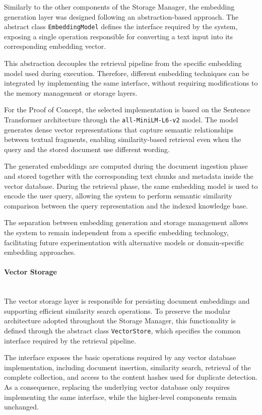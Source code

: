 Similarly to the other components of the Storage Manager, the embedding generation layer was designed following an abstraction-based approach. The abstract class \texttt{EmbeddingModel} defines the interface required by the system, exposing a single operation responsible for converting a text input into its corresponding embedding vector.

This abstraction decouples the retrieval pipeline from the specific embedding model used during execution. Therefore, different embedding techniques can be integrated by implementing the same interface, without requiring modifications to the memory management or storage layers.

For the Proof of Concept, the selected implementation is based on the Sentence Transformer architecture through the \texttt{all-MiniLM-L6-v2} model. The model generates dense vector representations that capture semantic relationships between textual fragments, enabling similarity-based retrieval even when the query and the stored document use different wording.

The generated embeddings are computed during the document ingestion phase and stored together with the corresponding text chunks and metadata inside the vector database. During the retrieval phase, the same embedding model is used to encode the user query, allowing the system to perform semantic similarity comparison between the query representation and the indexed knowledge base.

The separation between embedding generation and storage management allows the system to remain independent from a specific embedding technology, facilitating future experimentation with alternative models or domain-specific embedding approaches.


\paragraph{Vector Storage}~\\

The vector storage layer is responsible for persisting document embeddings and supporting efficient similarity search operations. To preserve the modular architecture adopted throughout the Storage Manager, this functionality is defined through the abstract class \texttt{VectorStore}, which specifies the common interface required by the retrieval pipeline.

The interface exposes the basic operations required by any vector database implementation, including document insertion, similarity search, retrieval of the complete collection, and access to the content hashes used for duplicate detection. As a consequence, replacing the underlying vector database only requires implementing the same interface, while the higher-level components remain unchanged.

